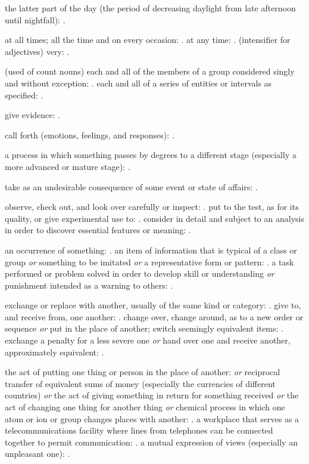   the latter part of the day (the period of decreasing daylight from late afternoon until nightfall): .

  at all times; all the time and on every occasion: . at any time: . (intensifier for adjectives) very: .

  (used of count nouns) each and all of the members of a group considered singly and without exception: . each and all of a series of entities or intervals as specified: .

  give evidence: .

  call forth (emotions, feelings, and responses): .

  a process in which something passes by degrees to a different stage (especially a more advanced or mature stage): .

  take as an undesirable consequence of some event or state of affairs: .

  observe, check out, and look over carefully or inspect: . put to the test, as for its quality, or give experimental use to: . consider in detail and subject to an analysis in order to discover essential features or meaning: .

  an occurrence of something: . an item of information that is typical of a class or group \textit{or} something to be imitated \textit{or} a representative form or pattern: . a task performed or problem solved in order to develop skill or understanding \textit{or} punishment intended as a warning to others: .

  exchange or replace with another, usually of the same kind or category: . give to, and receive from, one another: . change over, change around, as to a new order or sequence \textit{or} put in the place of another; switch seemingly equivalent items: . exchange a penalty for a less severe one \textit{or} hand over one and receive another, approximately equivalent: .

  the act of putting one thing or person in the place of another: \textit{or} reciprocal transfer of equivalent sums of money (especially the currencies of different countries) \textit{or} the act of giving something in return for something received \textit{or} the act of changing one thing for another thing \textit{or} chemical process in which one atom or ion or group changes places with another: . a workplace that serves as a telecommunications facility where lines from telephones can be connected together to permit communication: . a mutual expression of views (especially an unpleasant one): .

